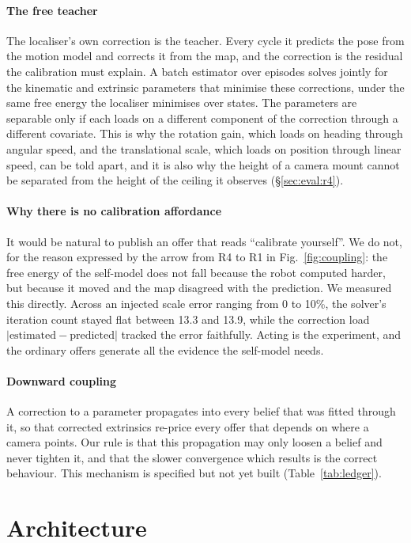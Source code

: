 \documentclass[10pt,twocolumn]{IEEEtran}
\begin{document}
\paragraph{The free teacher} The localiser's own correction is the teacher. Every cycle it predicts
the pose from the motion model and corrects it from the map, and the correction is the residual the
calibration must explain. A batch estimator over episodes solves jointly for the kinematic and
extrinsic parameters that minimise these corrections, under the same free energy the localiser
minimises over states. The parameters are separable only if each loads on a different component of
the correction through a different covariate. This is why the rotation gain, which loads on heading
through angular speed, and the translational scale, which loads on position through linear speed, can
be told apart, and it is also why the height of a camera mount cannot be separated from the height of
the ceiling it observes (\S\ref{sec:eval:r4}).

\paragraph{Why there is no calibration affordance} It would be natural to publish an offer that
reads ``calibrate yourself''. We do not, for the reason expressed by the arrow from R4 to R1 in
Fig.~\ref{fig:coupling}: the free energy of the self-model does not fall because the robot computed
harder, but because it moved and the map disagreed with the prediction. We measured this directly.
Across an injected scale error ranging from 0 to 10\%, the solver's iteration count stayed flat between
13.3 and 13.9, while the correction load $|\text{estimated} - \text{predicted}|$ tracked the error
faithfully. Acting is the experiment, and the ordinary offers generate all the evidence the self-model
needs.

\paragraph{Downward coupling} A correction to a parameter propagates into every belief that was fitted
through it, so that corrected extrinsics re-price every offer that depends on where a camera points.
Our rule is that this propagation may only loosen a belief and never tighten it, and that the slower
convergence which results is the correct behaviour. This mechanism is specified but not yet built
(Table~\ref{tab:ledger}).

\section{Architecture}\label{sec:arch}
\end{document}
